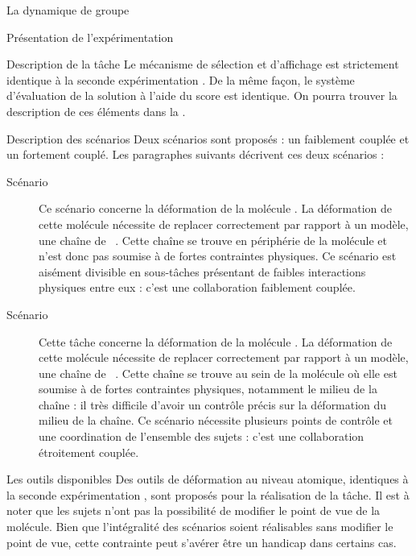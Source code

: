\documentclass[myfrancais]{mythesis}
\begin{document}
\begin{mychapter}{La dynamique de groupe}
\begin{mysection}{Présentation de l'expérimentation}
\begin{mysubsection}{Description de la tâche}
				Le mécanisme de sélection et d'affichage est strictement identique à la seconde expérimentation .
				De la même façon, le système d'évaluation de la solution à l'aide du score  est identique.
				On pourra trouver la description de ces éléments dans la .
				\begin{mysubsubsection}{Description des scénarios}
					Deux scénarios sont proposés : un faiblement couplée et un fortement couplé.
					Les paragraphes suivants décrivent ces deux scénarios :
					\begin{description}
						\item[Scénario~]
							Ce scénario concerne la déformation de la molécule \myPrion.
							La déformation de cette molécule nécessite de replacer correctement par rapport à un modèle, une chaîne de ~.
							Cette chaîne se trouve en périphérie de la molécule et n'est donc pas soumise à de fortes contraintes physiques.
							Ce scénario est aisément divisible en sous-tâches présentant de faibles interactions physiques entre eux : c'est une collaboration faiblement couplée.
						\item[Scénario~]
							Cette tâche concerne la déformation de la molécule \myUbiquitin.
							La déformation de cette molécule nécessite de replacer correctement par rapport à un modèle, une chaîne de ~.
							Cette chaîne se trouve au sein de la molécule où elle est soumise à de fortes contraintes physiques, notamment le milieu de la chaîne : il très difficile d'avoir un contrôle précis sur la déformation du milieu de la chaîne.
							Ce scénario nécessite plusieurs points de contrôle et une coordination de l'ensemble des sujets : c'est une collaboration étroitement couplée.
					\end{description}
				\end{mysubsubsection}
				\begin{mysubsubsection}{Les outils disponibles}
					Des outils de déformation au niveau atomique, identiques à la seconde expérimentation , sont proposés pour la réalisation de la tâche.
					Il est à noter que les sujets n'ont pas la possibilité de modifier le point de vue de la molécule.
					Bien que l'intégralité des scénarios soient réalisables sans modifier le point de vue, cette contrainte peut s'avérer être un handicap dans certains cas.

\end{mysubsubsection}
\end{mysubsection}
\end{mysection}
\end{mychapter}
\end{document}
